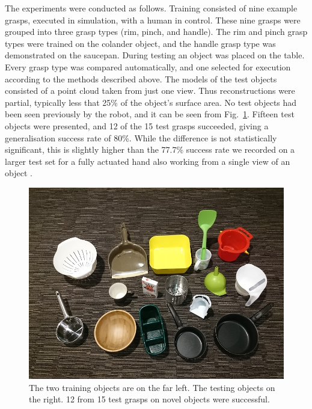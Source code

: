 The experiments were conducted as follows. Training consisted of nine example grasps, executed in simulation, with a human in control. These nine grasps were grouped into three grasp types (rim, pinch, and handle). The rim and pinch grasp types were trained on the colander object, and the handle grasp type was demonstrated on the saucepan. During testing an object was placed on the table. Every grasp type was compared automatically, and one selected for execution according to the methods described above. The models of the test objects consisted of a point cloud taken from just one view. Thus reconstructions were partial, typically less that 25\% of the object's surface area. No test objects had been seen previously by the robot, and it can be seen from Fig.~\ref{fig:test}. Fifteen test objects were presented, and 12 of the 15 test grasps succeeded, giving a generalisation success rate of 80\%. While the difference is not statistically significant, this is slightly higher than the 77.7\% success rate we recorded on a larger test set for a fully actuated hand also working from a single view of an object \cite{kopicki-ijrr15}.

\begin{figure}
 \includegraphics[width=0.9\columnwidth]{images/object_set_small}
 \caption{The two training objects are on the far left. The testing objects on the right. 12 from 15 test grasps on novel objects were successful.}
 \label{fig:test}
\end{figure}

